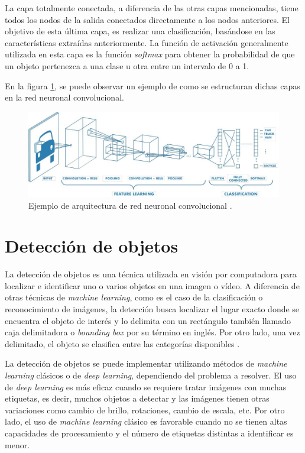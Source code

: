 La capa totalmente conectada, a diferencia de las otras capas mencionadas, tiene todos los nodos de la salida conectados directamente a los nodos anteriores. El objetivo de esta última capa, es realizar una clasificación, basándose en las características extraídas anteriormente. La función de activación generalmente utilizada en esta capa es la función \textit{softmax} para obtener la probabilidad de que un objeto pertenezca a una clase u otra entre un intervalo de 0 a 1.

En la figura \ref{fig:cnn}, se puede observar un ejemplo de como se estructuran dichas capas en la red neuronal convolucional.


\begin{figure}[ht]
	\centering
	\includegraphics[scale=.45]{./Figures/cnn-image.jpeg}
	\caption{Ejemplo de arquitectura de red neuronal convolucional \cite{WEBSITE:2}.}
	\label{fig:cnn}
\end{figure}


\section{Detección de objetos}

La detección de objetos es una técnica utilizada en visión por computadora para localizar e identificar uno o varios objetos en una imagen o vídeo. A diferencia de otras técnicas de \textit{machine learning}, como es el caso de la clasificación o reconocimiento de imágenes, la detección busca localizar el lugar exacto donde se encuentra el objeto de interés y lo delimita con un rectángulo también llamado caja delimitadora o \textit{bounding box} por su término en inglés. Por otro lado, una vez delimitado, el objeto se clasifica entre las categorías disponibles \cite{WEBSITE:5}.

La detección de objetos se puede implementar utilizando métodos de \textit{machine learning} clásicos o de \textit{deep learning}, dependiendo del problema a resolver\cite{WEBSITE:6}. El uso de \textit{deep learning} es más eficaz cuando se requiere tratar imágenes con muchas etiquetas, es decir, muchos objetos a detectar y las imágenes tienen otras variaciones como cambio de brillo, rotaciones, cambio de escala, etc. Por otro lado, el uso de \textit{machine learning} clásico es favorable cuando no se tienen altas capacidades de procesamiento y el número de etiquetas distintas a identificar es menor.

